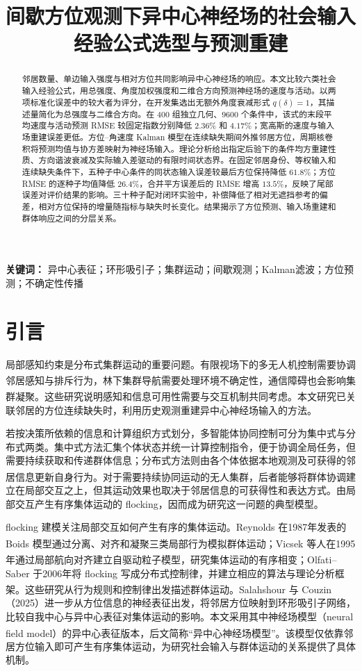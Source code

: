 \documentclass[UTF8,fontset=windows,11pt]{ctexart}
\title{间歇方位观测下异中心神经场的\newline 社会输入经验公式选型与预测重建}
\author{}
\date{}
\makeatletter
\renewcommand{\maketitle}{\begin{center}\vspace*{-1em}{\LARGE\bfseries\@title\par}\vspace{1em}\end{center}}
\newcommand{\upcite}[1]{\textsuperscript{\cite{#1}}}
\makeatother
\begin{document}
\maketitle

\begin{abstract}
邻居数量、单边输入强度与相对方位共同影响异中心神经场的响应。本文比较六类社会输入经验公式，用总强度、角度加权强度和二维合方向预测神经场的速度与活动。以两项标准化误差中的较大者为评分，在开发集选出无额外角度衰减形式 $q(\delta)=1$，其描述量简化为总强度与二维合方向。在 $400$ 组独立几何、$9600$ 个条件中，该式的末段平均速度与活动预测 RMSE 较固定指数分别降低 $2.36\%$ 和 $4.17\%$；宽高斯的速度与输入场重建误差更低。方位--角速度 Kalman 模型在连续缺失期间外推邻居方位，周期核卷积将预测均值与协方差映射为神经场输入。理论分析给出指定后验下的条件均方重建性质、方向谐波衰减及实际输入差驱动的有限时间状态界。在固定邻居身份、等权输入和连续缺失条件下，五种子中心条件的同状态输入误差较最后方位保持降低 $61.8\%$；方位 RMSE 的逐种子均值降低 $26.4\%$，合并平方误差后的 RMSE 增高 $13.5\%$，反映了尾部误差对评价结果的影响。三十种子配对闭环实验中，补偿降低了相对无遮挡参考的偏差，相对方位保持的增量随指标与缺失时长变化。结果揭示了方位预测、输入场重建和群体响应之间的分层关系。

\end{abstract}

\noindent\textbf{关键词：} 异中心表征；环形吸引子；集群运动；间歇观测；Kalman滤波；方位预测；不确定性传播

\section{引言}

局部感知约束是分布式集群运动的重要问题。有限视场下的多无人机控制需要协调邻居感知与排斥行为\upcite{Bai2024}，林下集群导航需要处理环境不确定性\upcite{Boldrer2026}，通信障碍也会影响集群凝聚\upcite{LiFlocking2024}。这些研究说明感知和信息可用性需要与交互机制共同考虑。本文研究已关联邻居的方位连续缺失时，利用历史观测重建异中心神经场输入的方法。

若按决策所依赖的信息和计算组织方式划分，多智能体协同控制可分为集中式与分布式两类。集中式方法汇集个体状态并统一计算控制指令，便于协调全局任务，但需要持续获取和传递群体信息；分布式方法则由各个体依据本地观测及可获得的邻居信息更新自身行为\upcite{OlfatiSaber2006}。对于需要持续协同运动的无人集群，后者能够将群体协调建立在局部交互之上，但其运动效果也取决于邻居信息的可获得性和表达方式。由局部交互产生有序集体运动的 flocking，因而成为研究这一问题的典型模型。

flocking 建模关注局部交互如何产生有序的集体运动。Reynolds 在1987年发表的 Boids 模型通过分离、对齐和凝聚三类局部行为模拟群体运动\upcite{Reynolds1987}；Vicsek 等人在1995年通过局部航向对齐建立自驱动粒子模型，研究集体运动的有序相变\upcite{Vicsek1995}；Olfati--Saber 于2006年将 flocking 写成分布式控制律，并建立相应的算法与理论分析框架\upcite{OlfatiSaber2006}。这些研究从行为规则和控制律出发描述群体运动。Salahshour 与 Couzin（2025）进一步从方位信息的神经表征出发，将邻居方位映射到环形吸引子网络，比较自我中心与异中心表征对集体运动的影响。本文采用其中神经场模型（neural field model）的异中心表征版本，后文简称“异中心神经场模型”\upcite{Salahshour2025}。该模型仅依靠邻居方位输入即可产生有序集体运动，为研究社会输入与群体运动的关系提供了具体机制。
\end{document}
